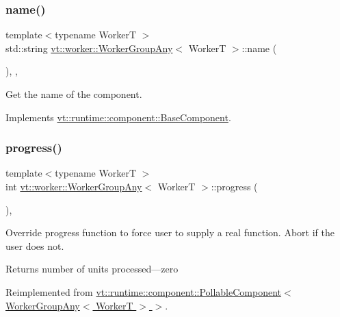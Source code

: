 \subsubsection{\texorpdfstring{name()}{name()}}
{\footnotesize\ttfamily template$<$typename WorkerT $>$ \\
std\+::string \hyperlink{structvt_1_1worker_1_1_worker_group_any}{vt\+::worker\+::\+Worker\+Group\+Any}$<$ WorkerT $>$\+::name (\begin{DoxyParamCaption}{ }\end{DoxyParamCaption})\hspace{0.3cm}{\ttfamily [inline]}, {\ttfamily [override]}, {\ttfamily [virtual]}}



Get the name of the component. 



Implements \hyperlink{structvt_1_1runtime_1_1component_1_1_base_component_a7701485f3539f78d42e6bad47fc7eb78}{vt\+::runtime\+::component\+::\+Base\+Component}.

\mbox{\label{structvt_1_1worker_1_1_worker_group_any_a1a2d6dc321514501e00c0373f2583146}} 
\subsubsection{\texorpdfstring{progress()}{progress()}}
{\footnotesize\ttfamily template$<$typename WorkerT $>$ \\
int \hyperlink{structvt_1_1worker_1_1_worker_group_any}{vt\+::worker\+::\+Worker\+Group\+Any}$<$ WorkerT $>$\+::progress (\begin{DoxyParamCaption}{ }\end{DoxyParamCaption})\hspace{0.3cm}{\ttfamily [override]}, {\ttfamily [virtual]}}



Override progress function to force user to supply a real function. Abort if the user does not. 

\begin{DoxyReturn}{Returns}
number of units processed---zero 
\end{DoxyReturn}


Reimplemented from \hyperlink{structvt_1_1runtime_1_1component_1_1_pollable_component_a34cad810026224d550cd9b0c9d1eff22}{vt\+::runtime\+::component\+::\+Pollable\+Component$<$ Worker\+Group\+Any$<$ Worker\+T $>$ $>$}.

